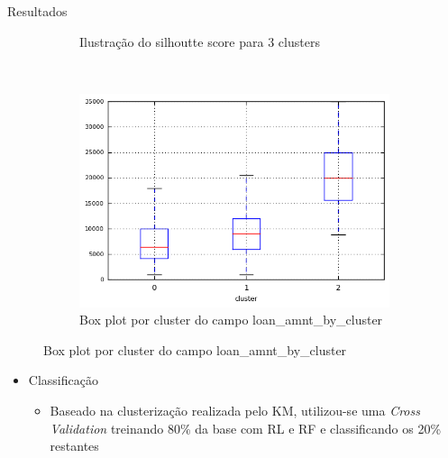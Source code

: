 \documentclass[final,hyperref={pdfpagelabels=false, brazil}]{beamer}
\let\olditem=\item%
\renewcommand{\item}{\olditem \justifying}%
\begin{document}
\begin{frame}[t]
\begin{columns}[t]
\begin{column}{.465\textwidth}
\begin{block}{Resultados}
\begin{itemize}
\begin{itemize}
\begin{figure}[t!]
\begin{subfigure}[t]{0.55\textwidth}
        \caption{Ilustração do silhoutte score para 3 clusters}
    \end{subfigure}%
    ~ 
    \begin{subfigure}[t]{0.35\textwidth}
        \centering
        \includegraphics[width=1\linewidth]{loan_amnt_by_cluster.png}
        \caption{Box plot por cluster do campo loan\_amnt\_by\_cluster}
    \end{subfigure}


\end{figure}



\end{itemize}

\end{itemize}

\begin{itemize}
\item Classificação

\begin{itemize}
\item Baseado na clusterização realizada pelo KM, utilizou-se uma \emph{Cross Validation} treinando 80\% da base com RL e RF e classificando os 20\% restantes

\end{itemize}


    

\end{itemize}
\end{block}
\end{column}
\end{columns}
\end{frame}
\end{document}
